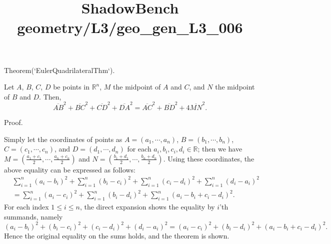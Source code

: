 \documentclass{article}
\title{ShadowBench geometry/L3/geo\_gen\_L3\_006}
\begin{document}
\maketitle

Theorem(`EulerQuadrilateralThm`).

Let $A$, $B$, $C$, $D$ be points in $\mathbb{R}^n$, $M$ the midpoint of $A$ and $C$, and $N$ the midpoint of $B$ and $D$. Then,
$$
\overline{AB}^2 + \overline{BC}^2 + \overline{CD}^2 + \overline{DA}^2 = \overline{AC}^2 + \overline{BD}^2 + 4 \overline{MN}^2.
$$

Proof.

Simply let the coordinates of points as $A = (a_1, \cdots, a_n)$, $B = (b_1, \cdots, b_n)$, $C = (c_1, \cdots, c_n)$, and $D = (d_1, \cdots, d_n)$ for each $a_i, b_i, c_i, d_i \in \mathbb{R}$; then we have $M = \left(\frac{a_1 + c_1}{2}, \cdots, \frac{a_n + c_n}{2}\right)$ and $N = \left(\frac{b_1 + d_1}{2}, \cdots, \frac{b_n + d_n}{2}\right)$. Using these coordinates, the above equality can be expressed as follows:
$$
\begin{align}
&\sum_{i=1}^n (a_i - b_i)^2 + \sum_{i=1}^n (b_i - c_i)^2 + \sum_{i=1}^n (c_i - d_i)^2 + \sum_{i=1}^n (d_i - a_i)^2 \\
& = \sum_{i=1}^n (a_i - c_i)^2 + \sum_{i=1}^n (b_i - d_i)^2 + \sum_{i=1}^n (a_i - b_i + c_i - d_i)^2.
\end{align}
$$
For each index $1 \le i \le n$, the direct expansion shows the equality by $i$'th summands, namely
$$
(a_i - b_i)^2 + (b_i - c_i)^2 + (c_i - d_i)^2 + (d_i - a_i)^2 = (a_i - c_i)^2 + (b_i - d_i)^2 + (a_i - b_i + c_i - d_i)^2.
$$
Hence the original equality on the sums holds, and the theorem is shown.
\end{document}
